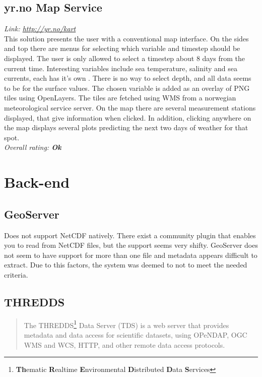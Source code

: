 \documentclass[11pt,a4paper,titlepage,oneside]{report}
\begin{document}
  \subsection{yr.no Map Service}
  \emph{Link: \url{http://yr.no/kart}} \\%
This solution presents the user with a conventional map interface. On the sides and top there are menus for selecting which variable and timestep should be displayed. The user is only allowed to select a timestep about 8 days from the current time. Interesting variables include sea temperature, salinity and sea currents, each has it's own . There is no way to select depth, and all data seems to be for the surface values. The chosen variable is added as an overlay of PNG tiles using OpenLayers. The tiles are fetched using WMS from a norwegian meteorological service server. On the map there are several measurement stations displayed, that give information when clicked. In addition, clicking anywhere on the map displays several plots predicting the next two days of weather for that spot.
  \\ \emph{Overall rating: \textbf{Ok}}

\section{Back-end}

\subsection{GeoServer}
Does not support NetCDF natively. There exist a community plugin that enables you to read from NetCDF files, but the support seems very shifty. GeoServer does not seem to have support for more than one file and metadata appears difficult to extract. Due to this factors, the system was deemed to not to meet the needed criteria.

\subsection{THREDDS}
\begin{quote}
The THREDDS\footnote{\textbf{Th}ematic \textbf{R}ealtime \textbf{E}nvironmental \textbf{D}istributed \textbf{D}ata \textbf{S}ervices} Data Server (TDS) is a web server that provides metadata and data access for scientific datasets, using OPeNDAP, OGC WMS and WCS, HTTP, and other remote data access protocols. \cite{TDS:Web}
\end{quote}
\end{document}
